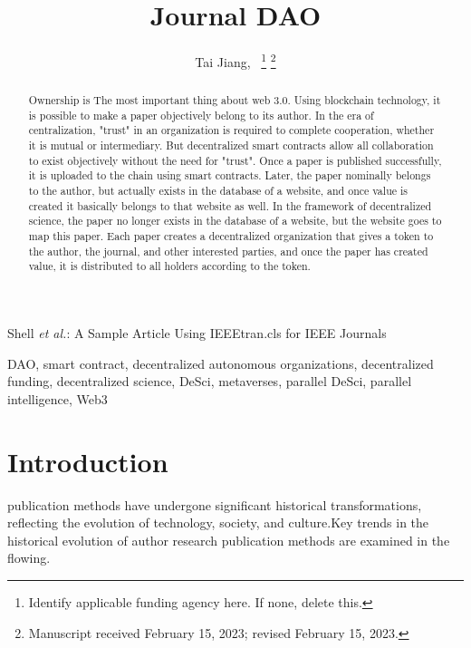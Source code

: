 \documentclass[lettersize,journal]{IEEEtran}
\begin{document}
\title{Journal DAO}

\author{Tai Jiang,~
\thanks{Identify applicable funding agency here. If none, delete this.}%
\thanks{Manuscript received February 15, 2023; revised February 15, 2023.}}

%
{Shell \MakeLowercase{\textit{et al.}}: A Sample Article Using IEEEtran.cls for IEEE Journals}


\maketitle

\begin{abstract}
Ownership is The most important thing about web 3.0. Using blockchain technology, it is possible to make a paper objectively belong to its author. In the era of centralization, "trust" in an organization is required to complete cooperation, whether it is mutual or intermediary. But decentralized smart contracts allow all collaboration to exist objectively without the need for "trust". Once a paper is published successfully, it is uploaded to the chain using smart contracts. Later, the paper nominally belongs to the author, but actually exists in the database of a website, and once value is created it basically belongs to that website as well. In the framework of decentralized science, the paper no longer exists in the database of a website, but the website goes to map this paper. Each paper creates a decentralized organization that gives a token to the author, the journal, and other interested parties, and once the paper has created value, it is distributed to all holders according to the token.
\end{abstract}

\begin{IEEEkeywords}
DAO, smart contract, decentralized autonomous organizations, decentralized funding, decentralized science, DeSci, metaverses, parallel DeSci, parallel intelligence, Web3
\end{IEEEkeywords}

\section{Introduction}
 publication methods have undergone significant historical transformations, reflecting the evolution of technology, society, and culture.Key trends in the historical evolution of author research publication methods are examined in the flowing.
\end{document}
